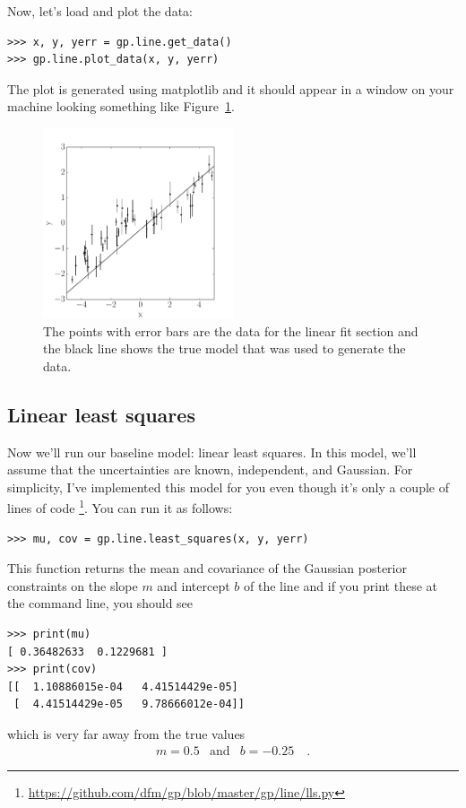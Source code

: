 \documentclass[12pt,preprint]{aastex}
\newcommand{\project}[1]{{\sffamily #1}}
\newcommand{\Fig}[1]{Figure~\ref{fig:#1}}
\newcommand{\fig}[1]{\Fig{#1}}
\newcommand{\figlabel}[1]{\label{fig:#1}}
\begin{document}
Now, let's load and plot the data:
\begin{lstlisting}
>>> x, y, yerr = gp.line.get_data()
>>> gp.line.plot_data(x, y, yerr)
\end{lstlisting}
The plot is generated using \project{matplotlib} and it should appear in a
window on your machine looking something like \fig{line-data}.

\begin{figure}[htbp]
\begin{center}
\includegraphics[width=0.5\textwidth]{figures/line_data.pdf}
\end{center}
\caption{%
The points with error bars are the data for the linear fit section and the
black line shows the true model that was used to generate the data.
\figlabel{line-data}}
\end{figure}

\subsection{Linear least squares}

Now we'll run our baseline model: linear least squares.
In this model, we'll assume that the uncertainties are known, independent, and
Gaussian.
For simplicity, I've implemented this model for you even though it's only a
couple of lines of code%
\footnote{\url{https://github.com/dfm/gp/blob/master/gp/line/lls.py}}.
You can run it as follows:
\begin{lstlisting}
>>> mu, cov = gp.line.least_squares(x, y, yerr)
\end{lstlisting}
This function returns the mean and covariance of the Gaussian posterior
constraints on the slope $m$ and intercept $b$ of the line and if you print
these at the command line, you should see
\begin{lstlisting}
>>> print(mu)
[ 0.36482633  0.1229681 ]
>>> print(cov)
[[  1.10886015e-04   4.41514429e-05]
 [  4.41514429e-05   9.78666012e-04]]
\end{lstlisting}
which is very far away from the true values
\begin{eqnarray}
m = 0.5 &\mathrm{and}& b = -0.25 \quad.
\end{eqnarray}
\end{document}
